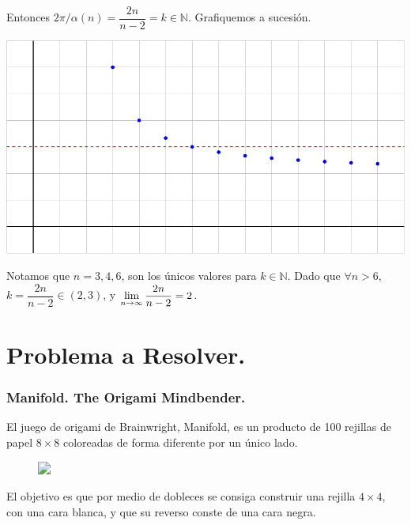 \documentclass{beamer}
\begin{document}
\begin{frame}[t]
	\begin{exampleblock}{}
		Entonces \(2 \pi / \alpha (n) = \dfrac{2n}{n-2} = k \in \mathbb{N}\).
		Grafiquemos a sucesión.
	\end{exampleblock}
	\vspace{2mm}
	\begin{exampleblock}{}
		\includegraphics[width= 0.9 \linewidth, page = 1]{IMAGENES/1_DEF/14/tikz.pdf}
	\end{exampleblock}
	\vspace{2mm}
	\begin{exampleblock}{}
		Notamos que \(n = 3,4,6\), son los únicos valores para \(k \in \mathbb{N}\).
		Dado que \(\forall n>6\), \(k = \dfrac{2n}{n-2} \in (2,3)\), y \(\displaystyle\lim_{n\rightarrow \infty} \dfrac{2n}{n-2} = 2\).
	\end{exampleblock}
	\vspace{2mm}
\end{frame}

\section{Problema a Resolver.} %
\frame{\sectionpage}
\begin{frame}[t]
	\frametitle{Manifold. The Origami Mindbender.}
	\begin{exampleblock}{}
		El juego de origami de Brainwright\texttrademark, Manifold\textcopyright, es un producto de 100 rejillas de papel $8\times 8$ coloreadas de forma diferente por un único lado. 
		\begin{figure}[hbtp!]\begin{overprint}
			\centering
			\includegraphics<1>[width= 0.8 \linewidth, page = 1]{IMAGENES/2_PROB/1/producto_3.png}
		\end{overprint}
	\end{figure}
	El objetivo es que por medio de dobleces se consiga construir una rejilla $4\times 4$, con una cara blanca, y que su reverso conste de una cara negra.
	\end{exampleblock}
	\vspace{2mm}
\end{frame}
\end{document}
